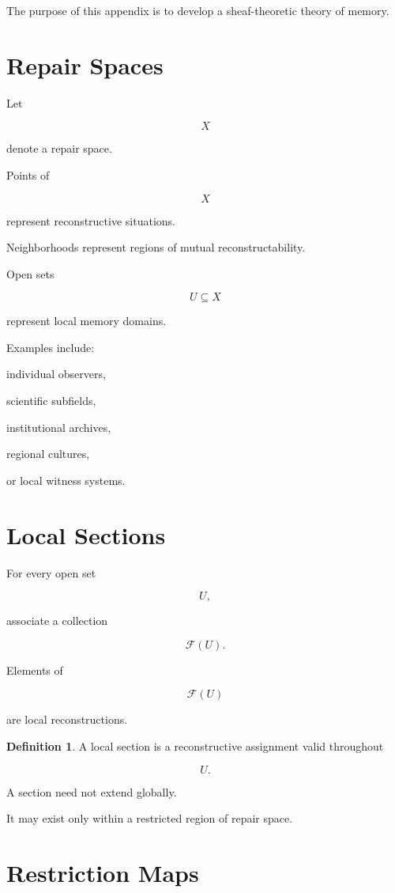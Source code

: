 \documentclass[12pt,oneside]{book}
\theoremstyle{plain} \newtheorem{theorem}{Theorem}[chapter] \newtheorem{lemma}[theorem]{Lemma} \newtheorem{proposition}[theorem]{Proposition} \newtheorem{corollary}[theorem]{Corollary}
\theoremstyle{definition} \newtheorem{definition}[theorem]{Definition} \newtheorem{axiom}[theorem]{Axiom} \newtheorem{construction}[theorem]{Construction}
\theoremstyle{remark} \newtheorem{remark}[theorem]{Remark} \newtheorem{example}[theorem]{Example}
\begin{document}
The purpose of this appendix is to develop a sheaf-theoretic theory of memory.

\section{Repair Spaces}

Let

\[
X
\]

denote a repair space.

Points of

\[
X
\]

represent reconstructive situations.

Neighborhoods represent regions of mutual reconstructability.

Open sets

\[
U\subseteq X
\]

represent local memory domains.

Examples include:

individual observers,

scientific subfields,

institutional archives,

regional cultures,

or local witness systems.

\section{Local Sections}

For every open set

\[
U,
\]

associate a collection

\[
\mathcal F(U).
\]

Elements of

\[
\mathcal F(U)
\]

are local reconstructions.

\begin{definition}

A local section is a reconstructive assignment valid throughout

\[
U.
\]

\end{definition}

A section need not extend globally.

It may exist only within a restricted region of repair space.

\section{Restriction Maps}
\end{document}
